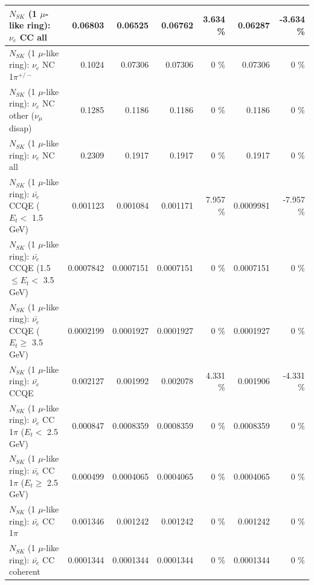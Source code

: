 \begin{table}
\begin{tabular}{| l | r | r | r  r | r  r |}
                                  $N_{SK}$ (1 $\mu$-like ring): $\nu_{e}$ CC all &         0.06803 &         0.06525 &         0.06762 &    3.634 \%  &         0.06287 &   -3.634 \%  \\ 
\hline
                           $N_{SK}$ (1 $\mu$-like ring): $\nu_e$ NC 1$\pi^{+/-}$ &          0.1024 &         0.07306 &         0.07306 &        0 \%  &         0.07306 &        0 \%  \\ 
                $N_{SK}$ (1 $\mu$-like ring): $\nu_e$ NC other ($\nu_\mu$ disap) &          0.1285 &          0.1186 &          0.1186 &        0 \%  &          0.1186 &        0 \%  \\ 
                                  $N_{SK}$ (1 $\mu$-like ring): $\nu_{e}$ NC all &          0.2309 &          0.1917 &          0.1917 &        0 \%  &          0.1917 &        0 \%  \\ 
\hline
\hline
\hline
            $N_{SK}$ (1 $\mu$-like ring): $\bar{\nu_e}$ CCQE ($E_{t} <$ 1.5 GeV) &        0.001123 &        0.001084 &        0.001171 &    7.957 \%  &       0.0009981 &   -7.957 \%  \\ 
   $N_{SK}$ (1 $\mu$-like ring): $\bar{\nu_e}$ CCQE (1.5 $\leq E_{t} <$ 3.5 GeV) &       0.0007842 &       0.0007151 &       0.0007151 &        0 \%  &       0.0007151 &        0 \%  \\ 
         $N_{SK}$ (1 $\mu$-like ring): $\bar{\nu_e}$ CCQE ($E_{t} \geq$ 3.5 GeV) &       0.0002199 &       0.0001927 &       0.0001927 &        0 \%  &       0.0001927 &        0 \%  \\ 
\hline
                                $N_{SK}$ (1 $\mu$-like ring): $\bar{\nu_e}$ CCQE &        0.002127 &        0.001992 &        0.002078 &    4.331 \%  &        0.001906 &   -4.331 \%  \\ 
\hline
       $N_{SK}$ (1 $\mu$-like ring): $\bar{\nu_e}$ CC 1$\pi$ ($E_{t} <$ 2.5 GeV) &        0.000847 &       0.0008359 &       0.0008359 &        0 \%  &       0.0008359 &        0 \%  \\ 
    $N_{SK}$ (1 $\mu$-like ring): $\bar{\nu_e}$ CC 1$\pi$ ($E_{t} \geq$ 2.5 GeV) &        0.000499 &       0.0004065 &       0.0004065 &        0 \%  &       0.0004065 &        0 \%  \\ 
\hline
                           $N_{SK}$ (1 $\mu$-like ring): $\bar{\nu_e}$ CC 1$\pi$ &        0.001346 &        0.001242 &        0.001242 &        0 \%  &        0.001242 &        0 \%  \\ 
                         $N_{SK}$ (1 $\mu$-like ring): $\bar{\nu_e}$ CC coherent &       0.0001344 &       0.0001344 &       0.0001344 &        0 \%  &       0.0001344 &        0 \%  \\ 

\end{tabular}
\end{table}
